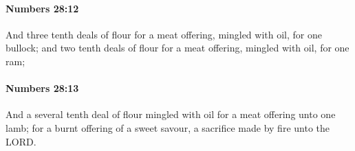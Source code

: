 		\paragraph{Numbers 28:12} %
			\label{NUMBERS-28-12}

			And three tenth deals of flour for a meat offering, mingled with oil, for one bullock; and two tenth deals of flour for a meat offering, mingled with oil, for one ram;


		\paragraph{Numbers 28:13} %
			\label{NUMBERS-28-13}

			And a several tenth deal of flour mingled with oil for a meat offering unto one lamb; for a burnt offering of a sweet savour, a sacrifice made by fire unto the LORD.


